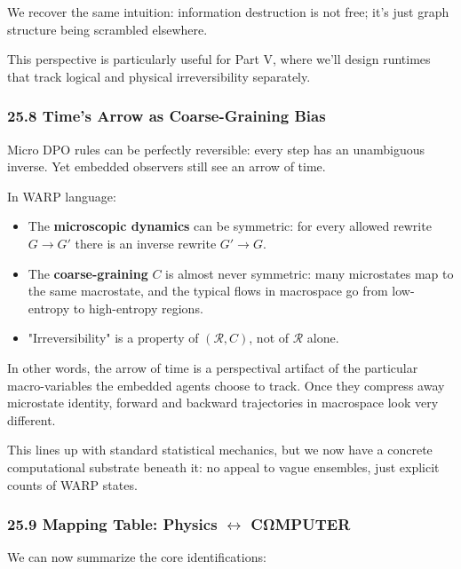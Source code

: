 We recover the same intuition: information destruction is not free; it’s just
graph structure being scrambled elsewhere.

This perspective is particularly useful for Part V, where we’ll design runtimes
that track logical and physical irreversibility separately.

\subsubsection*{25.8  Time’s Arrow as Coarse-Graining Bias}

Micro DPO rules can be perfectly reversible: every step has an unambiguous inverse.
Yet embedded observers still see an arrow of time.

In WARP language:

\begin{itemize}
  \item The \textbf{microscopic dynamics} can be symmetric: for every allowed
        rewrite $G \to G'$ there is an inverse rewrite $G' \to G$.

  \item The \textbf{coarse-graining} $C$ is almost never symmetric: many microstates
        map to the same macrostate, and the typical flows in macrospace go from
        low-entropy to high-entropy regions.

  \item "Irreversibility" is a property of $(\mathcal{R}, C)$, not of $\mathcal{R}$ alone.
\end{itemize}

In other words, the arrow of time is a perspectival artifact of the particular
macro-variables the embedded agents choose to track. Once they compress away
microstate identity, forward and backward trajectories in macrospace look very
different.

This lines up with standard statistical mechanics, but we now have a concrete
computational substrate beneath it: no appeal to vague ensembles, just explicit
counts of WARP states.

\subsubsection*{25.9  Mapping Table: Physics $\leftrightarrow$ CΩMPUTER}

We can now summarize the core identifications:

